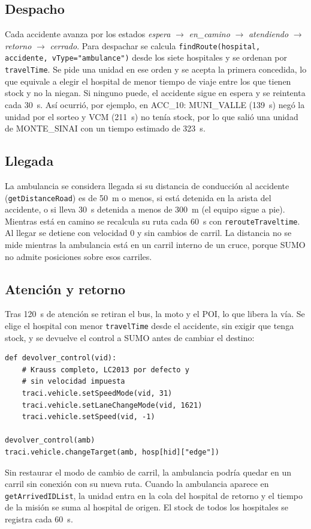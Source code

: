 \documentclass[conference,a4paper]{IEEEtran}
\begin{document}
\subsection{Despacho}
Cada accidente avanza por los estados \emph{espera} $\rightarrow$ \emph{en\_camino}
$\rightarrow$ \emph{atendiendo} $\rightarrow$ \emph{retorno} $\rightarrow$
\emph{cerrado}. Para despachar se calcula
\texttt{findRoute(hospital, accidente, vType="ambulance")} desde los siete hospitales y se
ordenan por \texttt{travelTime}. Se pide una unidad en ese orden y se acepta la primera
concedida, lo que equivale a elegir el hospital de menor tiempo de viaje entre los que
tienen stock y no la niegan. Si ninguno puede, el accidente sigue en espera y se
reintenta cada 30~s. Así ocurrió, por ejemplo, en ACC\_10: MUNI\_VALLE (139~s) negó la
unidad por el sorteo y VCM (211~s) no tenía stock, por lo que salió una unidad de
MONTE\_SINAI con un tiempo estimado de 323~s.

\subsection{Llegada}
La ambulancia se considera llegada si su distancia de conducción al accidente
(\texttt{getDistanceRoad}) es de 50~m o menos, si está detenida en la arista del
accidente, o si lleva 30~s detenida a menos de 300~m (el equipo sigue a pie). Mientras
está en camino se recalcula su ruta cada 60~s con \texttt{rerouteTraveltime}. Al llegar se
detiene con velocidad 0 y sin cambios de carril. La distancia no se mide mientras la
ambulancia está en un carril interno de un cruce, porque SUMO no admite posiciones sobre
esos carriles.

\subsection{Atención y retorno}
Tras 120~s de atención se retiran el bus, la moto y el POI, lo que libera la vía. Se
elige el hospital con menor \texttt{travelTime} desde el accidente, sin exigir que tenga
stock, y se devuelve el control a SUMO antes de cambiar el destino:
\begin{lstlisting}
def devolver_control(vid):
    # Krauss completo, LC2013 por defecto y
    # sin velocidad impuesta
    traci.vehicle.setSpeedMode(vid, 31)
    traci.vehicle.setLaneChangeMode(vid, 1621)
    traci.vehicle.setSpeed(vid, -1)

devolver_control(amb)
traci.vehicle.changeTarget(amb, hosp[hid]["edge"])
\end{lstlisting}
Sin restaurar el modo de cambio de carril, la ambulancia podría quedar en un carril sin
conexión con su nueva ruta. Cuando la ambulancia aparece en \texttt{getArrivedIDList}, la
unidad entra en la cola del hospital de retorno y el tiempo de la misión se suma al
hospital de origen. El stock de todos los hospitales se registra cada 60~s.
\end{document}
